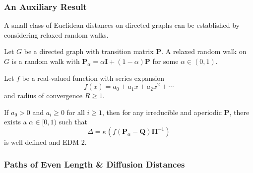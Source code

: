 \documentclass[professionalfonts, hyperref={pdfpagelabels=false,
  colorlinks=true, linkcolor=purple}]{beamer}
\begin{document}
\begin{frame}
  \frametitle{An Auxiliary Result}
  A small class of Euclidean distances on directed graphs can be
  established by considering \alert{relaxed} random walks.

  \vskip10pt Let $G$ be a directed graph with transition matrix
  $\mathbf{P}$. A relaxed random walk on $G$ is a random walk with
  $\mathbf{P}_\alpha = \alpha \mathbf{I} + (1- \alpha)\mathbf{P}$ for
  some $\alpha \in (0,1)$.

  \vskip10pt Let $f$ be a real-valued function with series expansion
  \begin{equation*}
    f(x) = a_0 + a_1 x + a_2 x^2 + \cdots
  \end{equation*}
  and radius of convergence $R \geq 1$. 
  
  \vskip10pt
  \begin{alertblock}{}
    If $a_0 > 0$ and $a_i \geq 0$ for all $i \geq 1$, then for any
    irreducible and aperiodic $\mathbf{P}$,
    there exists a $\alpha \in [0,1)$ such that
    \begin{equation*}
     \Delta = \kappa(f(\mathbf{P}_\alpha - \mathbf{Q})
      \bm{\Pi}^{-1})        
    \end{equation*}
    is well-defined and EDM-2.
  \end{alertblock}{}
\end{frame}

\begin{frame}
\frametitle{Paths of Even Length  \& Diffusion Distances}
  \subfiglabelskip=0pt
  \begin{figure}[htbp]
    \label{fig:two-step}
    \centering
    \hspace{3pt}
  \end{figure}
\end{frame}


\end{document}
